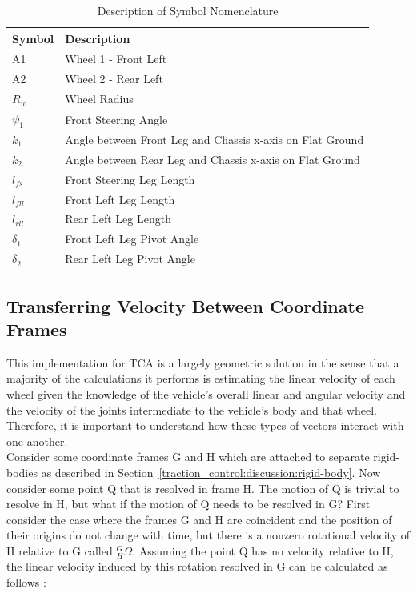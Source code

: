 \begin{table}[H]
\begin{center}\label{table:2}
	\begin{tabular}{| >{\centering\arraybackslash} m{1.2in} | >{\centering\arraybackslash} m{4.5in} |} 
		\hline
		Symbol & Description \\
		\hline
		A1 & Wheel 1 - Front Left \\
		A2 & Wheel 2 - Rear Left \\
		$R_{w}$ & Wheel Radius \\
		$\psi_{1}$ & Front Steering Angle \\
		$k_{1}$ & Angle between Front Leg and Chassis x-axis on Flat Ground \\
		$k_{2}$ & Angle between Rear Leg and Chassis x-axis on Flat Ground \\
		$l_{fs}$ & Front Steering Leg Length \\ 
		$l_{fll}$ & Front Left Leg Length \\ 
		$l_{rll}$ & Rear Left Leg Length \\ 
		$\delta_{1}$ & Front Left Leg Pivot Angle    \\
		$\delta_{2}$ & Rear Left Leg Pivot Angle   \\
		\hline
	
	\end{tabular}
\caption{Description of Symbol Nomenclature}
\end{center}
\end{table}

\subsection{Transferring Velocity Between Coordinate Frames}\label{traction_control:discussion:transferring-velocity}
This implementation for \ac{TCA} is a largely geometric solution in the sense that a majority of the calculations it performs is estimating the linear velocity of each wheel given the knowledge of the vehicle's overall linear and angular velocity and the velocity of the joints intermediate to the vehicle's body and that wheel. Therefore, it is important to understand how these types of vectors interact with one another. \\

Consider some coordinate frames G and H which are attached to separate rigid-bodies as described in Section~\ref{traction_control:discussion:rigid-body}. Now consider some point Q that is resolved in frame H. The motion of Q is trivial to resolve in H, but what if the motion of Q needs to be resolved in G? First consider the case where the frames G and H are coincident and the position of their origins do not change with time, but there is a nonzero rotational velocity of H relative to G called ${}^{G}_{H}\Omega$. Assuming the point Q has no velocity relative to H, the linear velocity induced by this rotation resolved in G can be calculated as follows \cite{craig}:

